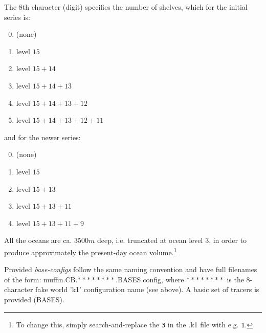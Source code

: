 \documentclass[11pt,fleqn]{book} %
\begin{document}
The 8th character (digit) specifies the number of shelves, which for the initial series is:

\vspace{1mm}
\small\begin{enumerate}[noitemsep]
\setlength{\itemindent}{.2in}
\setcounter{enumi}{-1}
\item (none)
\item level \(15\)
\item level \(15 + 14\)
\item level \(15 + 14 + 13\)
\item level \(15 + 14 + 13 + 12\)
\item level \(15 + 14 + 13 + 12 + 11\)
\end{enumerate}\normalsize
\vspace{1mm}
and for the newer series:
\small\begin{enumerate}[noitemsep]
\setlength{\itemindent}{.2in}
\setcounter{enumi}{-1}
\item (none)
\item level \(15\)
\item level \(15 + 13\)
\item level \(15 + 13 + 11\)
\item level \(15 + 13 + 11 + 9\)
\end{enumerate}\normalsize
\vspace{1mm}

All the oceans are ca. \(3500 m\) deep, i.e. truncated at ocean level \(3\), in order to produce approximately the present-day ocean volume.\footnote{To change this, simply search-and-replace the \texttt{3} in the \textsf{\footnotesize .k1} file with e.g. \texttt{1}.}

Provided \textit{base-configs} follow the same naming convention and have full filenames of the form: \textsf{\footnotesize muffin.CB.\(\ast\ast\ast\ast\ast\ast\ast\ast\).BASES.config}, where \(\ast\ast\ast\ast\ast\ast\ast\ast\) is the 8-character fake world 'k1' configuration name (see above). A basic set of tracers is provided (\textsf{\footnotesize BASES}).
\end{document}
